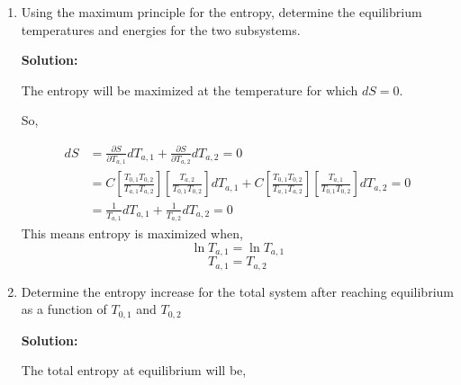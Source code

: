 \documentclass[10pt]{article}
\newenvironment{Solution}
    {\textbf{Solution:}
    
    \vspace{5mm}
    \begin{tcolorbox}
    }
    {
    \end{tcolorbox}
    \vspace{5mm}
    }
\begin{document}
\begin{enumerate}
\begin{enumerate}
\begin{Solution}
\end{Solution}
\newpage

\item Using the maximum principle for the entropy, determine the equilibrium temperatures and energies for the two subsystems.

\begin{Solution}
The entropy will be maximized at the temperature for which $d S = 0$. 
 
So,

\begin{align}
    d S &= \frac{\partial S}{\partial T_{a,1}}d T_{a,1} + \frac{\partial S}{\partial T_{a,2}}d T_{a,2} = 0\\
    &=C\left[ \frac{T_{0,1}T_{0,2}}{T_{a,1}T_{a,2}} \right]\left[ \frac{T_{a,2}}{T_{0,1}T_{0,2}} \right]d T_{a,1} + C \left[ \frac{T_{0,1}T_{0,2}}{T_{a,1}T_{a,2}} \right]\left[ \frac{T_{a,1}}{T_{0,1}T_{0,2}} \right]d T_{a,2} = 0\\
    &= \frac{1}{T_{a,1}} d T_{a,1} + \frac{1}{T_{a,2}} d T_{a,2} = 0 
\end{align}
This means entropy is maximized when,
\begin{equation}
    \ln{T_{a,1}} = \ln{T_{a,1}}
\end{equation}
\begin{equation}
   \boxed{ T_{a,1}=T_{a,2}}
\end{equation}

\end{Solution}

\item Determine the entropy increase for the total system after reaching equilibrium as a function of $T_{0, 1}$ and $T_{0, 2}$

\begin{Solution}
The total entropy at equilibrium will be,


\end{Solution}
\end{enumerate}
\end{enumerate}
\end{document}
